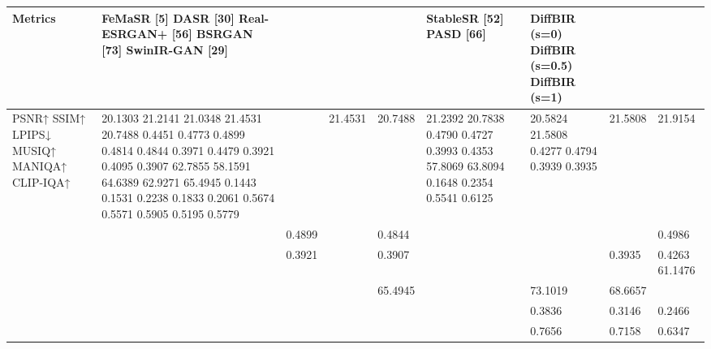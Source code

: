 \begin{tabular}{lllllllll}
\toprule
Metrics & FeMaSR [5] DASR [30] Real-ESRGAN+ [56] BSRGAN [73] SwinIR-GAN [29] &  &  &  & StableSR [52] PASD [66] & DiffBIR (s=0) DiffBIR (s=0.5) DiffBIR (s=1) &  &  \\
\midrule
PSNR↑ SSIM↑ LPIPS↓ MUSIQ↑ MANIQA↑ CLIP-IQA↑ & 20.1303 21.2141 21.0348 21.4531 20.7488 0.4451 0.4773 0.4899 0.4814 0.4844 0.3971 0.4479 0.3921 0.4095 0.3907 62.7855 58.1591 64.6389 62.9271 65.4945 0.1443 0.1531 0.2238 0.1833 0.2061 0.5674 0.5571 0.5905 0.5195 0.5779 &  & 21.4531 & 20.7488 & 21.2392 20.7838 0.4790 0.4727 0.3993 0.4353 57.8069 63.8094 0.1648 0.2354 0.5541 0.6125 & 20.5824 21.5808 0.4277 0.4794 0.3939 0.3935 & 21.5808 & 21.9154 \\
 &  & 0.4899 &  & 0.4844 &  &  &  & 0.4986 \\
 &  & 0.3921 &  & 0.3907 &  &  & 0.3935 & 0.4263 61.1476 \\
 &  &  &  & 65.4945 &  & 73.1019 & 68.6657 &  \\
 &  &  &  &  &  & 0.3836 & 0.3146 & 0.2466 \\
 &  &  &  &  &  & 0.7656 & 0.7158 & 0.6347 \\
\bottomrule
\end{tabular}
